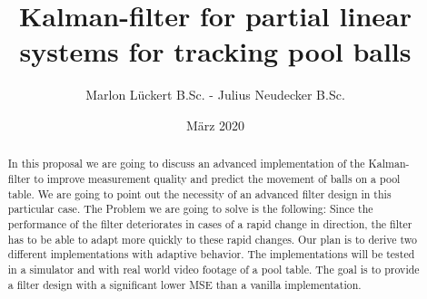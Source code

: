 \documentclass[titlepage, a4paper, 11pt]{scrartcl}
\begin{document}
\title{Kalman-filter for partial linear systems for tracking pool balls}
\author{Marlon Lückert B.Sc. - Julius Neudecker B.Sc.}
\date{März 2020}
\maketitle

\tableofcontents

\begin{abstract}
    In this proposal we are going to discuss an advanced implementation of the Kalman-filter \cite{kalman} to improve measurement quality and predict the movement of balls on a pool table. 
    We are going to point out the necessity of an advanced filter design in this particular case. The Problem we are going to solve is the following:
    Since the performance of the filter deteriorates in cases of a rapid change in direction, the filter has to be able to adapt more quickly to these rapid changes.
    Our plan is to derive two different implementations with adaptive behavior. The implementations will be tested in a simulator and with real world video footage of a pool table.
    The goal is to provide a filter design with a significant lower MSE than a vanilla implementation.
\end{abstract}
\end{document}
